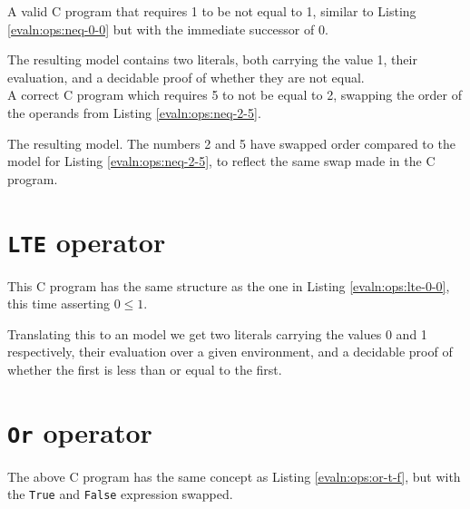     
    A valid C program that requires 1 to be not equal to 1, similar to Listing \ref{evaln:ops:neq-0-0} but with the immediate successor of 0.
    
    The resulting model contains two literals, both carrying the value 1, their evaluation, and a decidable proof of whether they are not equal.
    \\
    
    
    A correct C program which requires 5 to not be equal to 2, swapping the order of the operands from Listing \ref{evaln:ops:neq-2-5}.
    
    The resulting \Idris model. The numbers 2 and 5 have swapped order compared to the model for Listing \ref{evaln:ops:neq-2-5}, to reflect the same swap made in the C program.


\section{\texttt{LTE} operator}\label{app:evaln:ops:lte}
    
    
    This C program has the same structure as the one in Listing \ref{evaln:ops:lte-0-0}, this time asserting $0 \leq 1$.
    
    
    Translating this to an \Idris model we get two literals carrying the values 0 and 1 respectively, their evaluation over a given environment, and a decidable proof of whether the first is less than or equal to the first.

    
    


\section{\texttt{Or} operator}\label{app:evaln:ops:or}
    
    
    The above C program has the same concept as Listing \ref{evaln:ops:or-t-f}, but with the \texttt{True} and \texttt{False} expression swapped.
